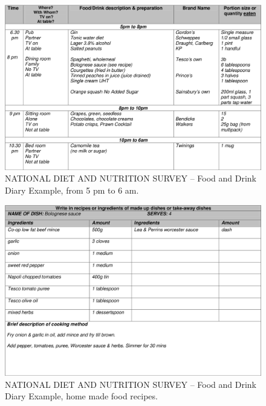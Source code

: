 \begin{figure}
	\centering
	\includegraphics{Figures/Diary03.png}
	\decoRule
	\caption[One day food diary example 5 pm to 6 am]{NATIONAL DIET AND NUTRITION SURVEY -- Food and Drink Diary Example, from 5 pm to 6 am.}
	\label{fig:diary2}
\end{figure}


\begin{figure}
\centering
\includegraphics{Figures/Diary3.png}
\decoRule
\caption[Food diary example of home made food recipes]{NATIONAL DIET AND NUTRITION SURVEY -- Food and Drink Diary Example, home made food recipes.}
\label{fig:diary3}
\end{figure}
